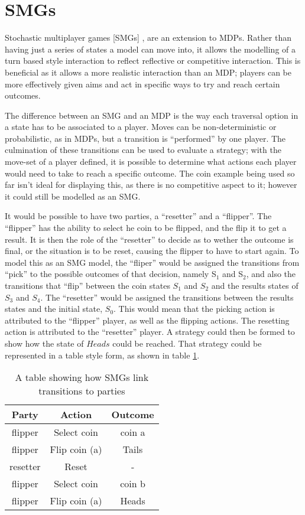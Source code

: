 \documentclass{l4proj}
\begin{document}
\section{SMGs}


Stochastic multiplayer games [SMGs] \cite{chen2013prism}, are an extension to MDPs. Rather than having just a series of states a model can move into, it allows the modelling of a turn based style interaction to reflect reflective or competitive interaction. This is beneficial as it allows a more realistic interaction than an MDP; players can be more effectively given aims and act in specific ways to try and reach certain outcomes. 

The difference between an SMG and an MDP is the way  each traversal option in a state has to be associated to a player. Moves can be non-deterministic or probabilistic, as in MDPs, but a transition is ``performed'' by one player. The culmination of these transitions can be used to evaluate a strategy; with the move-set of a player defined, it is possible to determine what actions each player would need to take to reach a specific outcome. The coin example being used so far isn't ideal for displaying this, as there is no competitive aspect to it; however it could still be modelled as an SMG.

It would be possible to have two parties, a ``resetter'' and a ``flipper''. The ``flipper'' has the ability to select he coin to be flipped, and the flip it to get a result. It is then the role of the ``resetter'' to decide as to wether the outcome is final, or the situation is to be reset, causing the flipper to have to start again. To model this as an SMG model, the ``fliper'' would be assigned the transitions from ``pick'' to the possible outcomes of that decision, namely S$_1$ and S$_2$, and also the transitions that ``flip'' between the coin states $S_1$ and $S_2$ and the results states of $S_3$ and $S_4$. The ``resetter'' would be assigned the transitions between the results states and the initial state, $S_0$. This would mean that the picking action is attributed to the ``flipper'' player, as well as the flipping actions. The resetting action is attributed to the ``resetter'' player.  A strategy could then be formed to show how the state of $Heads$ could be reached. That strategy could be represented in a table style form, as shown in table \ref{smgTable}. 

\begin{table}[h!]
\centering
\begin{tabular}{ c || c || c }
  \hline                       
  Party & Action & Outcome \\
  \hline
  flipper & Select coin & coin a  \\
  flipper & Flip coin (a) & Tails \\
  resetter & Reset & -  \\
  flipper & Select coin & coin b  \\
  flipper & Flip coin (a) & Heads \\
  \hline  
\end{tabular}
\caption{A table showing how SMGs link transitions to parties}
\label{smgTable}
\end{table}
\end{document}
